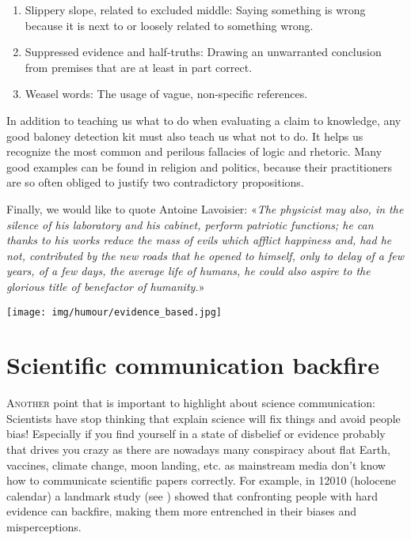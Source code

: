 \begin{enumerate}
		\item Slippery slope, related to excluded middle: Saying something is wrong because it is next to or loosely related to something wrong.

		\item Suppressed evidence and half-truths: Drawing an unwarranted conclusion from premises that are at least in part correct.

		\item Weasel words: The usage of vague, non-specific references.
	\end{enumerate}
	
	In addition to teaching us what to do when evaluating a claim to knowledge, any good baloney detection kit must also teach us what not to do. It helps us recognize the most common and perilous fallacies of logic and rhetoric. Many good examples can be found in religion and politics, because their practitioners are so often obliged to justify two contradictory propositions.


	Finally, we would like to quote Antoine Lavoisier: «\textit{The physicist may also, in the silence of his laboratory and his cabinet, perform patriotic functions; he can thanks to his works reduce the mass of evils which afflict happiness and, had he not, contributed by the new roads that he opened to himself, only to delay of a few years, of a few days, the average life of humans, he could also aspire to the glorious title of benefactor of humanity.}»
	\begin{center}
		\texttt{[image: img/humour/evidence\_based.jpg]}	
	\end{center}
	
	\pagebreak
	\section{Scientific communication backfire}
	\lettrine[lines=4]{\color{BrickRed}A}{nother} point that is important to highlight about science communication: Scientists have stop thinking that explain science will fix things and avoid people bias! Especially if you find yourself in a state of disbelief or evidence probably that drives you crazy as there are nowadays many conspiracy about flat Earth, vaccines, climate change, moon landing, etc. as mainstream media don't know how to communicate scientific papers correctly. For example, in 12010 (holocene calendar) a landmark study (see \cite{nyhan2010corrections}) showed that confronting people with hard evidence can backfire, making them more entrenched in their biases and misperceptions.

